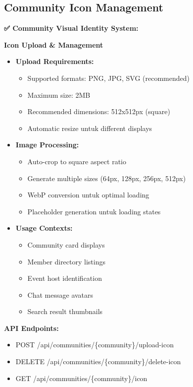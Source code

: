 \documentclass[12pt,a4paper]{article}
\begin{document}
\subsection{Community Icon Management}

\begin{implemented}
\textbf{✅ Community Visual Identity System:}

\textbf{Icon Upload \& Management}
\begin{itemize}
    \item \textbf{Upload Requirements:}
    \begin{itemize}
        \item Supported formats: PNG, JPG, SVG (recommended)
        \item Maximum size: 2MB
        \item Recommended dimensions: 512x512px (square)
        \item Automatic resize untuk different displays
    \end{itemize}
    \item \textbf{Image Processing:}
    \begin{itemize}
        \item Auto-crop to square aspect ratio
        \item Generate multiple sizes (64px, 128px, 256px, 512px)
        \item WebP conversion untuk optimal loading
        \item Placeholder generation untuk loading states
    \end{itemize}
    \item \textbf{Usage Contexts:}
    \begin{itemize}
        \item Community card displays
        \item Member directory listings
        \item Event host identification
        \item Chat message avatars
        \item Search result thumbnails
    \end{itemize}
\end{itemize}

\textbf{API Endpoints:}
\begin{itemize}
    \item POST /api/communities/\{community\}/upload-icon
    \item DELETE /api/communities/\{community\}/delete-icon
    \item GET /api/communities/\{community\}/icon
\end{itemize}
\end{implemented}
\end{document}
